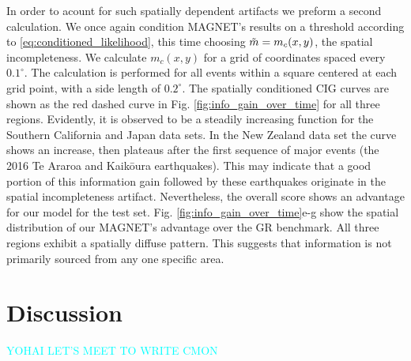 \documentclass[pdflatex]{sn-jnl}
\newcommand{\neri}[1]{{\textcolor{cyan}{#1}}}
\begin{document}
In order to acount for such spatially dependent artifacts we preform a second calculation. We once again condition MAGNET's results on a threshold according to \ref{eq:conditioned_likelihood}, this time choosing $\Tilde{m}=m_c(x,y)$, the spatial incompleteness. We calculate $m_c(x,y)$ for a grid of coordinates spaced every $0.1^\circ$. The calculation is performed for all events within a square centered at each grid point, with a side length of $0.2^\circ$. The spatially conditioned CIG curves are shown as the red dashed curve in Fig. \ref{fig:info_gain_over_time} for all three regions. Evidently, it is observed to be a steadily increasing function for the Southern California and Japan data sets. In the New Zealand data set the curve shows an increase, then plateaus after the first sequence of major events (the 2016 Te Araroa and Kaikōura earthquakes). This may indicate that a good portion of this information gain followed by these earthquakes originate in the spatial incompleteness artifact. Nevertheless, the overall score shows an advantage for our model for the test set. Fig. \ref{fig:info_gain_over_time}e-g show the spatial distribution of our MAGNET's advantage over the GR benchmark. All three regions exhibit a spatially diffuse pattern. This suggests that information is not primarily sourced from any one specific area.


\section{Discussion}
\neri{YOHAI LET'S MEET TO WRITE CMON}


\let\oldbibliography\thebibliography
\renewcommand{\thebibliography}[1]{%
  \oldbibliography{#1}%
  \setlength{\itemsep}{10pt}%
}
% 
% 
\newpage


\let\oldthebibliography=\thebibliography
\let\oldendthebibliography=\endthebibliography
\renewenvironment{thebibliography}[1]{
    \oldthebibliography{#1}
    \setcounter{enumiv}{34}
}{\oldendthebibliography}
\end{document}
